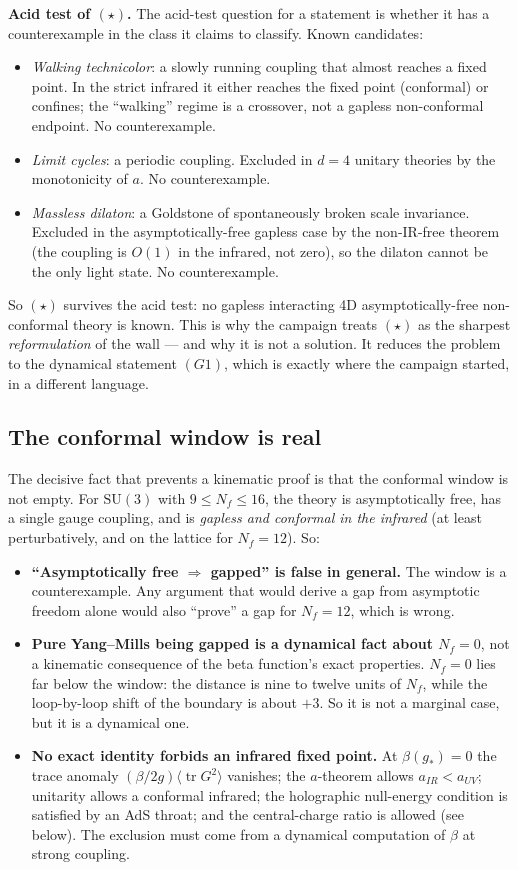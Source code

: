 \textbf{Acid test of $(\star)$.} The acid-test question for a statement is whether it has a
counterexample in the class it claims to classify. Known candidates:
\begin{itemize}
\item \emph{Walking technicolor}: a slowly running coupling that almost reaches a fixed point.
  In the strict infrared it either reaches the fixed point (conformal) or confines; the
  ``walking'' regime is a crossover, not a gapless non-conformal endpoint. No counterexample.
\item \emph{Limit cycles}: a periodic coupling. Excluded in $d=4$ unitary theories by the
  monotonicity of $a$. No counterexample.
\item \emph{Massless dilaton}: a Goldstone of spontaneously broken scale invariance. Excluded in
  the asymptotically-free gapless case by the non-IR-free theorem (the coupling is $O(1)$ in the
  infrared, not zero), so the dilaton cannot be the only light state. No counterexample.
\end{itemize}
So $(\star)$ survives the acid test: no gapless interacting 4D asymptotically-free non-conformal
theory is known. This is why the campaign treats $(\star)$ as the sharpest \emph{reformulation}
of the wall --- and why it is not a solution. It reduces the problem to the dynamical statement
$(G1)$, which is exactly where the campaign started, in a different language.

\subsection{The conformal window is real}

The decisive fact that prevents a kinematic proof is that the conformal window is not empty. For
$\mathrm{SU}(3)$ with $9\le N_f\le16$, the theory is asymptotically free, has a single gauge
coupling, and is \emph{gapless and conformal in the infrared} (at least perturbatively, and on the
lattice for $N_f=12$). So:
\begin{itemize}
\item \textbf{``Asymptotically free $\Rightarrow$ gapped'' is false in general.} The window is a
counterexample. Any argument that would derive a gap from asymptotic freedom alone would also
``prove'' a gap for $N_f=12$, which is wrong.
\item \textbf{Pure Yang--Mills being gapped is a dynamical fact about $N_f=0$}, not a kinematic
consequence of the beta function's exact properties. $N_f=0$ lies far below the window: the
distance is nine to twelve units of $N_f$, while the loop-by-loop shift of the boundary is about
$+3$. So it is not a marginal case, but it is a dynamical one.
\item \textbf{No exact identity forbids an infrared fixed point.} At $\beta(g_*)=0$ the trace
anomaly $(\beta/2g)\langle\operatorname{tr}G^2\rangle$ vanishes; the $a$-theorem allows
$a_{IR}<a_{UV}$; unitarity allows a conformal infrared; the holographic null-energy condition is
satisfied by an AdS throat; and the central-charge ratio is allowed (see below). The exclusion
must come from a dynamical computation of $\beta$ at strong coupling.
\end{itemize}


